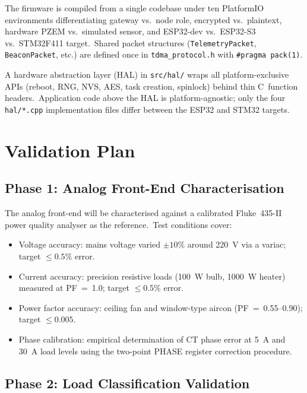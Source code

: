 \documentclass[conference]{IEEEtran}
\begin{document}
The firmware is compiled from a single codebase under ten PlatformIO
environments differentiating gateway vs.\ node role, encrypted vs.\
plaintext, hardware PZEM vs.\ simulated sensor, and ESP32-dev vs.\
ESP32-S3 vs.\ STM32F411 target.\ Shared packet structures
(\texttt{TelemetryPacket}, \texttt{BeaconPacket}, etc.) are defined
once in \texttt{tdma\_protocol.h} with \texttt{\#pragma pack(1)}.

A hardware abstraction layer (HAL) in \texttt{src/hal/} wraps all
platform-exclusive APIs (reboot, RNG, NVS, AES, task creation,
spinlock) behind thin C~function headers.\ Application code above the
HAL is platform-agnostic; only the four \texttt{hal/*.cpp}
implementation files differ between the ESP32 and STM32 targets.

\section{Validation Plan}
\label{sec:validation}

\subsection{Phase 1: Analog Front-End Characterisation}

The analog front-end will be characterised against a calibrated
Fluke~435-II power quality analyser as the reference.\ Test
conditions cover:
\begin{itemize}
  \item Voltage accuracy: mains voltage varied $\pm 10\%$ around 220~V
        via a variac; target \(\le 0.5\%\) error.
  \item Current accuracy: precision resistive loads (100~W bulb,
        1000~W heater) measured at PF~=~1.0; target \(\le 0.5\%\) error.
  \item Power factor accuracy: ceiling fan and window-type aircon
        (PF~=~0.55--0.90); target \(\le 0.005\).
  \item Phase calibration: empirical determination of CT phase error
        at 5~A and 30~A load levels using the two-point PHASE register
        correction procedure.
\end{itemize}

\subsection{Phase 2: Load Classification Validation}
\end{document}

